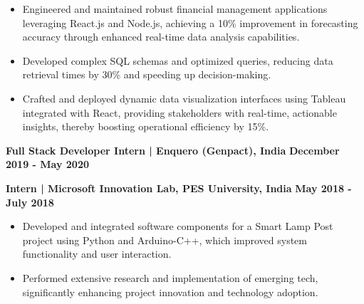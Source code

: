 \documentclass{article}
\begin{document}
\begin{itemize}[noitemsep,nolistsep,leftmargin=*]
\item {\small Engineered and maintained robust financial management applications leveraging React.js and Node.js, achieving a 10\% improvement in forecasting accuracy through enhanced real-time data analysis capabilities.}
\item {\small Developed complex SQL schemas and optimized queries, reducing data retrieval times by 30\% and speeding up decision-making.}
\item {\small Crafted and deployed dynamic data visualization interfaces using Tableau integrated with React, providing stakeholders with real-time, actionable insights, thereby boosting operational efficiency by 15\%.}
\end{itemize}
\vspace{1mm}
\noindent \textbf{Full Stack Developer Intern | Enquero (Genpact), India} \hfill \textbf{December 2019 - May 2020}
\vspace{1mm} 
\noindent \textbf{Intern | Microsoft Innovation Lab, PES University, India} \hfill \textbf{May 2018 - July 2018}
\begin{itemize}[noitemsep,nolistsep,leftmargin=*]
\item {\small Developed and integrated software components for a Smart Lamp Post project using Python and Arduino-C++, which improved system functionality and user interaction.}
\item {\small Performed extensive research and implementation of emerging tech, significantly enhancing project innovation and technology adoption.}
\end{itemize}
\vspace{2mm} 
%
%
\end{document}
